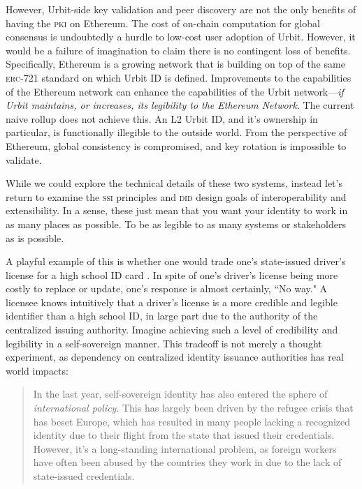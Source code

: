 \documentclass[twoside]{article}
\begin{document}
However, Urbit-side key validation and peer discovery are not the only benefits of having the \textsc{pki} on Ethereum. The cost of on-chain computation for global consensus is undoubtedly a hurdle to low-cost user adoption of Urbit. However, it would be a failure of imagination to claim there is no contingent loss of benefits. Specifically, Ethereum is a growing network that is building on top of the same \textsc{erc}-721 standard on which Urbit ID is defined. Improvements to the capabilities of the Ethereum network can enhance the capabilities of the Urbit network—\emph{if Urbit maintains, or increases, its legibility to the Ethereum Network}.  The current naive rollup does not achieve this. An L2 Urbit ID, and it's ownership in particular, is functionally illegible to the outside world. From the perspective of Ethereum, global consistency is compromised, and key rotation is impossible to validate. 

While we could explore the technical details of these two systems, instead let's return to examine the \textsc{ssi} principles and \textsc{did} design goals of interoperability and extensibility. In a sense, these just mean that you want your identity to work in as many places as possible. To be as legible to as many systems or stakeholders as is possible.

A playful example of this is whether one would trade one's state-issued driver's license for a high school ID card \citep{Sarlev2024}.  In spite of one's driver's license being more costly to replace or update, one's response is almost certainly, ``No way." A licensee knows intuitively that a driver's license is a more credible and legible identifier than a high school ID, in large part due to the authority of the centralized issuing authority. Imagine achieving such a level of credibility and legibility in a self-sovereign manner.  This tradeoff is not merely a thought experiment, as dependency on centralized identity issuance authorities has real world impacts:

\begin{quote}
In the last year, self-sovereign identity has also entered the sphere of \emph{international policy}. This has largely been driven by the refugee crisis that has beset Europe, which has resulted in many people lacking a recognized identity due to their flight from the state that issued their credentials. However, it’s a long-standing international problem, as foreign workers have often been abused by the countries they work in due to the lack of state-issued credentials.  \citep{Allen2016}
\end{quote}
\end{document}
